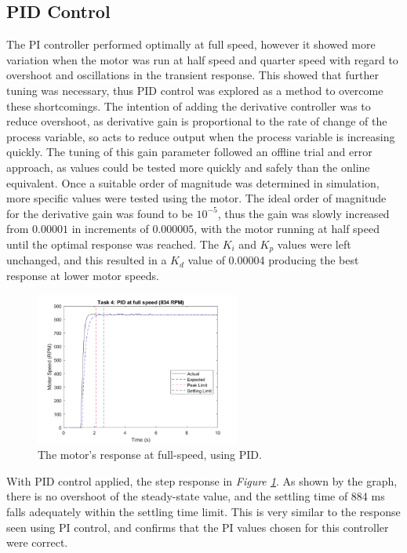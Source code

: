 \documentclass[11pt, onecolumn]{article}
\begin{document}
\subsection*{PID Control}
\par The PI controller performed optimally at full speed, however it showed more variation when the motor was run at half speed and quarter speed with regard to overshoot and oscillations in the transient response. This showed that further tuning was necessary, thus PID control was explored as a method to overcome these shortcomings. The intention of adding the derivative controller was to reduce overshoot, as derivative gain is proportional to the rate of change of the process variable, so acts to reduce output when the process variable is increasing quickly. The tuning of this gain parameter followed an offline trial and error approach, as values could be tested more quickly and safely than the online equivalent. Once a suitable order of magnitude was determined in simulation, more specific values were tested using the motor. The ideal order of magnitude for the derivative gain was found to be $10^{-5}$, thus the gain was slowly increased from $0.00001$ in increments of $0.000005$, with the motor running at half speed until the optimal response was reached. The $K_i$ and $K_p$ values were left unchanged, and this resulted in a $K_d$ value of 0.00004 producing the best response at lower motor speeds.
\begin{figure}[h!]
    \centering
    \includegraphics[width=0.6\textwidth]{q4-pid1.png}
    \caption{The motor's response at full-speed, using PID.}
    \label{fig:q4-pid1}
\end{figure}
\par With PID control applied, the step response in \textit{Figure \ref{fig:q4-pid1}}. As shown by the graph, there is no overshoot of the steady-state value, and the settling time of 884 ms falls adequately within the settling time limit. This is very similar to the response seen using PI control, and confirms that the PI values chosen for this controller were correct.
\end{document}
